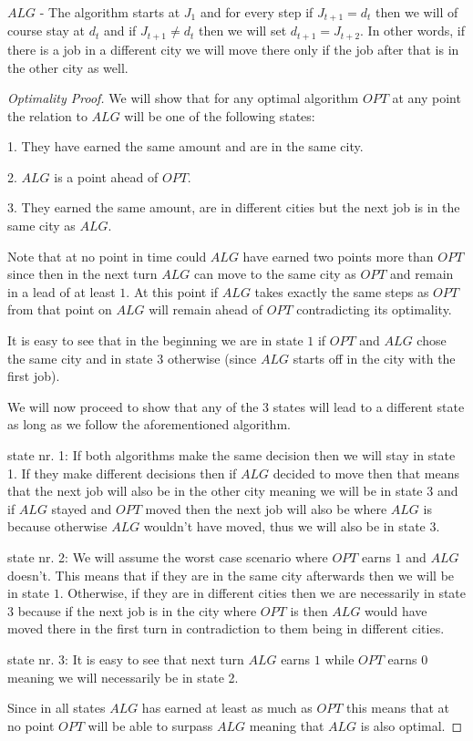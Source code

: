 \documentclass[]{article}
\begin{document}
$ ALG $ - The algorithm starts at $ J_1 $ and for every step if $ J_{t+1} = d_{t} $ then we will of course stay at $ d_t $ and if $ J_{t+1} \neq d_{t} $ then we will set $ d_{t+1} = J_{t+2} $. In other words, if there is a job in a different city we will move there only if the job after that is in the other city as well.

\begin{proof}[Optimality Proof]
	
	We will show that for any optimal algorithm $ OPT $ at any point the relation to $ ALG $ will be one of the following states:
	
	1. They have earned the same amount and are in the same city.
	
	2. $ ALG $ is a point ahead of $ OPT $.
	
	3. They earned the same amount, are in different cities but the next job is in the same city as $ ALG $.
	
	Note that at no point in time could $ ALG $ have earned two points more than $ OPT $ since then in the next turn $ ALG $ can move to the same city as $ OPT $ and remain in a lead of at least $ 1 $. At this point if $ ALG $ takes exactly the same steps as $ OPT $ from that point on $ ALG $ will remain ahead of $ OPT $ contradicting its optimality.
	
	It is easy to see that in the beginning we are in state $ 1 $ if $ OPT $ and $ ALG $ chose the same city and in state $ 3 $ otherwise (since $ ALG $ starts off in the city with the first job).
	
	We will now proceed to show that any of the 3 states will lead to a different state as long as we follow the aforementioned algorithm.
	
	state nr. 1: If both algorithms make the same decision then we will stay in state 1. If they make different decisions then if $ ALG $ decided to move then that means that the next job will also be in the other city
	meaning we will be in state 3 and if $ ALG $ stayed and $ OPT $ moved then the next job will also be where
	$ ALG $ is because otherwise $ ALG $ wouldn't have moved, thus we will also be in state $ 3 $.
	
	state nr. 2: We will assume the worst case scenario where $ OPT $ earns $ 1 $ and $ ALG $ doesn't. This means
	that if they are in the same city afterwards then we will be in state $ 1 $. Otherwise, if they are in
	different cities then we are necessarily in state $ 3 $ because if the next job is in the city where $ OPT $
	is then $ ALG $ would have moved there in the first turn in contradiction to them being in different cities.
	
	state nr. 3: It is easy to see that next turn $ ALG $ earns $ 1 $ while $ OPT $ earns $ 0 $ meaning we will
	necessarily be in state 2.
	
	Since in all states $ ALG $ has earned at least as much as $ OPT $ this means that at no point $ OPT $ 
	will be able to surpass $ ALG $ meaning that $ ALG $ is also optimal.
\end{proof}
\end{document}
